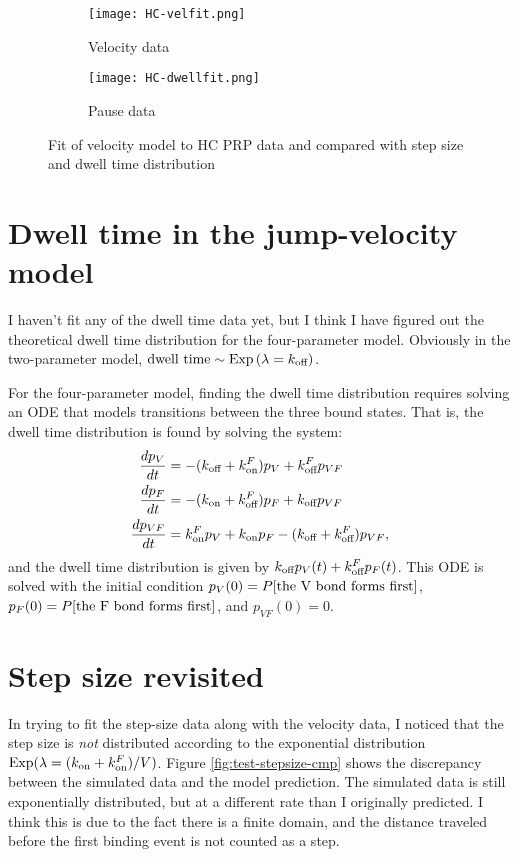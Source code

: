 \documentclass{article}
\newcommand{\tn}{\textnormal}
\newcommand{\dd}{d}
\newcommand{\Der}[2]{\frac{\dd #1}{\dd #2}}
\DeclareMathOperator{\Exp}{Exp}
\begin{document}
\begin{figure}
  \centering
  \begin{subfigure}{0.48\textwidth}
    \texttt{[image: HC-velfit.png]}
    \caption{Velocity data}
  \end{subfigure}
  \hfill
  \begin{subfigure}{0.48\textwidth}
    \texttt{[image: HC-dwellfit.png]}
    \caption{Pause data}
  \end{subfigure}
  \caption{Fit of velocity model to HC PRP data and compared
    with step size and dwell time distribution}
  \label{fig:hc-velfit}
\end{figure}

\section{Dwell time in the jump-velocity model}
\label{sec:dwell-time-jump}

I haven't fit any of the dwell time data yet, but I think I have
figured out the theoretical dwell time distribution for the
four-parameter model. Obviously in the two-parameter model, $\tn{dwell
  time} \sim \Exp\left(\lambda = k_\tn{off}\right)$.

For the four-parameter model, finding the dwell time distribution
requires solving an ODE that models transitions between the three
bound states. That is, the dwell time distribution is found by solving
the system:
\begin{align}
  \Der{p_V}{t} &= -(k_\tn{off} + k_\tn{on}^F)p_V + k_\tn{off}^F p_{VF}
  \\
  \Der{p_F}{t} &= -(k_\tn{on} + k_\tn{off}^F)p_F + k_\tn{off} p_{VF}
  \\
  \Der{p_{VF}}{t} &= k_\tn{on}^F p_V + k_\tn{on} p_F - (k_\tn{off} +
                    k_\tn{off}^F) p_{VF},
\end{align}
and the dwell time distribution is given by
$k_\tn{off} p_V(t) + k_\tn{off}^F p_F(t)$. This ODE is solved with the
initial condition $p_V(0) = P[\tn{the V bond forms first}]$,
$p_F(0) = P[\tn{the F bond forms first}]$, and $p_{VF}(0) = 0$.

\section{Step size revisited}
\label{sec:step-size-revisited}

In trying to fit the step-size data along with the velocity data, I
noticed that the step size is \emph{not} distributed according to the
exponential distribution $\Exp(\lambda = (k_\tn{on} +
k_\tn{on}^F)/V)$. Figure \ref{fig:test-stepsize-cmp} shows the
discrepancy between the simulated data and the model prediction. The
simulated data is still exponentially distributed, but at a different
rate than I originally predicted. I think this is due to the fact
there is a finite domain, and the distance traveled before the first
binding event is not counted as a step.
\end{document}
